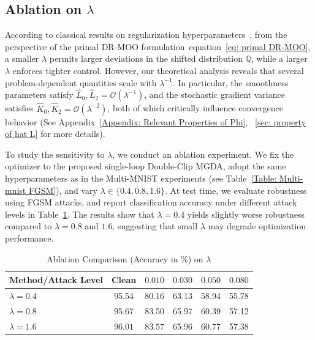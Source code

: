 \documentclass[twoside]{article} %
\def\eqref#1{equation~\ref{#1}}
\theoremstyle{plain}
\theoremstyle{definition}
\theoremstyle{remark}
\newcommand{\hL}{\hat{L}}
\begin{document}
\subsection{Ablation on $\lambda$}
According to classical results on regularization hyperparameters~\citep{PRML}, from the perspective of the primal DR-MOO formulation~\eqref{eq: primal DR-MOO}, a smaller $\lambda$ permits larger deviations in the shifted distribution $\mathbb{Q}$, while a larger $\lambda$ enforces tighter control. However, our theoretical analysis reveals that several problem-dependent quantities scale with $\lambda^{-1}$. In particular, the smoothness parameters satisfy $\hL_0, \hL_2 = \mathcal{O}(\lambda^{-1})$, and the stochastic gradient variance satisfies $\hat{K}_0,\hat{K}_2 = \mathcal{O}(\lambda^{-2})$, both of which critically influence convergence behavior (See Appendix~\ref{Appendix: Relevant Properties of Phi}, ~\ref{sec: property of hat L} for more details).

To study the sensitivity to $\lambda$, we conduct an ablation experiment. We fix the optimizer to the proposed single-loop Double-Clip MGDA, adopt the same hyperparameters as in the Multi-MNIST experiments (see Table~\ref{Table: Multi-mnist FGSM}), and vary $\lambda \in \{0.4, 0.8, 1.6\}$. At test time, we evaluate robustness using FGSM attacks, and report classification accuracy under different attack levels in Table~\ref{Table: Lambda Ablation}. The results show that $\lambda=0.4$ yields slightly worse robustness compared to $\lambda=0.8$ and $1.6$, suggesting that small $\lambda$ may degrade optimization performance.
\begin{table}[t]
\caption{Ablation Comparison (Accuracy in \%) on $\lambda$}
\label{Table: Lambda Ablation}
\centering
{
\scriptsize
\renewcommand{\arraystretch}{1.08}
\setlength{\tabcolsep}{1.5pt}
\begin{tabular*}{\textwidth}{
    @{\extracolsep{\fill}}
    lccccc
    @{}
}
\toprule
Method/Attack Level & Clean & $0.010$ & $0.030$ & $0.050$ & $0.080$ \\
\midrule
$\lambda=0.4$ & 95.54 & 80.16 & 63.13 & 58.94 & 55.78 \\
$\lambda=0.8$ & 95.67 & 83.50 & 65.97 & 60.39 & 57.12 \\
$\lambda=1.6$ & ${96.01}$ & ${83.57}$ & 65.96 & 60.77 & 57.38 \\
\bottomrule
\end{tabular*}}
\end{table}
\end{document}
